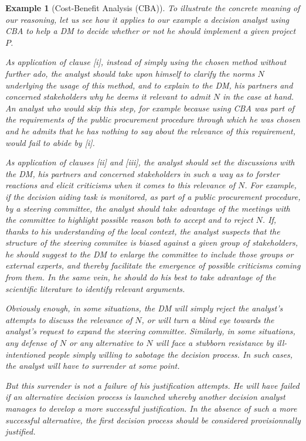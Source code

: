 \documentclass[preprint, french, english, 11pt, authoryear]{elsarticle}%
\newtheorem{example}{Example}
\begin{document}
\begin{example}[Cost-Benefit Analysis (CBA)]
To illustrate the concrete meaning of our reasoning, let us see how it applies to our example a decision analyst using CBA to help a \ac{DM} to decide whether or not he should implement a given project $P$.

As application of clause [i], instead of simply using the chosen method without further ado, the analyst should take upon himself to clarify the norms $N$ underlying the usage of this method, and to explain to the \ac{DM}, his partners and concerned stakeholders why he deems it relevant to admit $N$ in the case at hand. An analyst who would skip this step, for example because using CBA was part of the requirements of the public procurement procedure through which he was chosen and he admits that he has nothing to say about the relevance of this requirement, would fail to abide by [i].

As application of clauses [ii] and [iii], the analyst should set the discussions with the \ac{DM}, his partners and concerned stakeholders in such a way as to forster reactions and elicit criticisms when it comes to this relevance of $N$. For example, if the decision aiding task is monitored, as part of a public procurement procedure, by a steering committee, the analyst should take advantage of the meetings with the committee to highlight possible reason both to accept and to reject $N$. If, thanks to his understanding of the local context, the analyst suspects that the structure of the steering commitee is biased against a given group of stakeholders, he should suggest to the \ac{DM} to enlarge the committee to include those groups or external experts, and thereby facilitate the emergence of possible criticisms coming from them. In the same vein, he should do his best to take advantage of the scientific literature to identify relevant arguments.  

Obviously enough, in some situations, the \ac{DM} will simply reject the analyst's attempts to discuss the relevance of $N$, or will turn a blind eye towards the analyst's request to expand the steering committee. Similarly, in some situations, any defense of $N$ or any alternative to $N$ will face a stubborn resistance by ill-intentioned people simply willing to sabotage the decision process. In such cases, the analyst will have to surrender at some point.

But this surrender is not a failure of his justification attempts. He will have failed if an alternative decision process is launched whereby another decision analyst manages to develop a more successful justification. In the absence of such a more successful alternative, the first decision process should be considered provisionnally justified.


\end{example}
\end{document}
